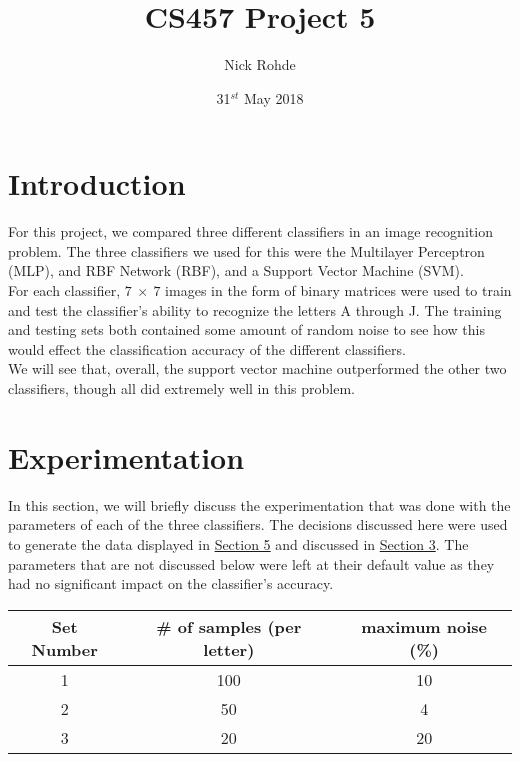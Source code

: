 \documentclass{article}
\title{CS457 Project 5}
\author{Nick Rohde}
\date{31$^{st}$ May 2018}
\begin{document}
\maketitle
\tableofcontents
\pagebreak

\section{Introduction} \label{S1}
	For this project, we compared three different classifiers in an image recognition problem. The three classifiers we used for this were the Multilayer Perceptron (MLP), and RBF Network (RBF), and a Support Vector Machine (SVM). \\
	
	For each classifier, $7~\times~7$ images in the form of binary matrices were used to train and test the classifier's ability to recognize the letters A through J. The training and testing sets both contained some amount of random noise to see how this would effect the classification accuracy of the different classifiers. \\
	
	We will see that, overall, the support vector machine outperformed the other two classifiers, though all did extremely well in this problem.


\section{Experimentation} \label{S2}
	In this section, we will briefly discuss the experimentation that was done with the parameters of each of the three classifiers. The decisions discussed here were used to generate the data displayed in \hyperref[S5]{Section 5} and discussed in \hyperref[S3]{Section 3}. The parameters that are not discussed below were left at their default value as they had no significant impact on the classifier's accuracy. \\
	
	\begin{minipage}{\linewidth}
		\centering
		\begin{tabular}{c|cc}\label{Test_Setup}
			Set Number 	& \# of samples (per letter)	& maximum noise (\%) \\
			\hline
			1					&  100 			 	&	10				 \\
			2					&  50				&	4					\\ 
			3					&  20	 			&	20					\\
		\end{tabular}
	\end{minipage}
	
\end{document}
